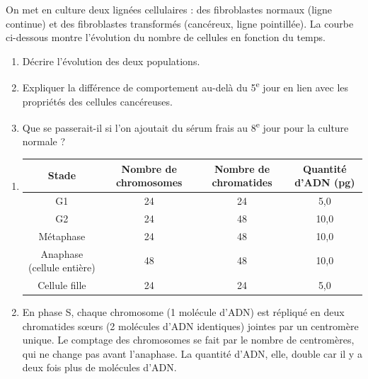 \documentclass[11pt]{article}
\begin{document}
\begin{exercice}
On met en culture deux lignées cellulaires : des fibroblastes normaux (ligne continue) et des fibroblastes transformés (cancéreux, ligne pointillée). La courbe ci-dessous montre l'évolution du nombre de cellules en fonction du temps.
\begin{center}
\end{center}
\begin{enumerate}
\item Décrire l'évolution des deux populations.
\item Expliquer la différence de comportement au-delà du 5\textsuperscript{e} jour en lien avec les propriétés des cellules cancéreuses.
\item Que se passerait-il si l'on ajoutait du sérum frais au 8\textsuperscript{e} jour pour la culture normale ?
\end{enumerate}
\end{exercice}

\begin{corrige}[Exercice 1]
\begin{enumerate}
\item
\begin{center}
\begin{tabular}{|c|c|c|c|}
\hline
\rowcolor{popblueL} Stade & Nombre de chromosomes & Nombre de chromatides & Quantité d'ADN (pg) \\
\hline
G1 & 24 & 24 & 5,0 \\
\hline
G2 & 24 & 48 & 10,0 \\
\hline
Métaphase & 24 & 48 & 10,0 \\
\hline
Anaphase (cellule entière) & 48 & 48 & 10,0 \\
\hline
Cellule fille & 24 & 24 & 5,0 \\
\hline
\end{tabular}
\end{center}
\item En phase S, chaque chromosome (1 molécule d'ADN) est répliqué en deux chromatides sœurs (2 molécules d'ADN identiques) jointes par un centromère unique. Le comptage des chromosomes se fait par le nombre de centromères, qui ne change pas avant l'anaphase. La quantité d'ADN, elle, double car il y a deux fois plus de molécules d'ADN.
\end{enumerate}
\end{corrige}
\end{document}
